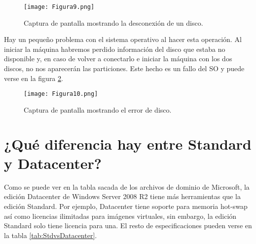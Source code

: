 \begin{figure}[H]
\centering
\texttt{[image: Figura9.png]} 
\caption{Captura de pantalla mostrando la desconexión de un disco.} \label{fig:figura9}
\end{figure}



Hay un pequeño problema con el sistema operativo al hacer esta operación. Al iniciar la máquina habremos perdido información del disco que estaba no disponible y, en caso 
de volver a conectarlo e iniciar la máquina con los dos discos, no nos aparecerán las particiones. Este hecho es un fallo del SO y puede verse en la figura \ref{fig:figura10}.

\begin{figure}[H]
\centering
\texttt{[image: Figura10.png]} 
\caption{Captura de pantalla mostrando el error de disco.} \label{fig:figura10}
\end{figure}




\section{¿Qué diferencia hay entre Standard y Datacenter?}

Como se puede ver en la tabla sacada de los archivos\cite{tabstddat} de dominio de Microsoft, la edición Datacenter de Windows Server 2008 R2 tiene
más herramientas que la edición Standard. Por ejemplo, Datacenter tiene soporte para memoria hot-swap así como licencias ilimitadas para imágenes virtuales, sin embargo, la 
edición Standard solo tiene licencia para una. El resto de especificaciones pueden verse en la tabla \ref{tab:StdvsDatacenter}.

